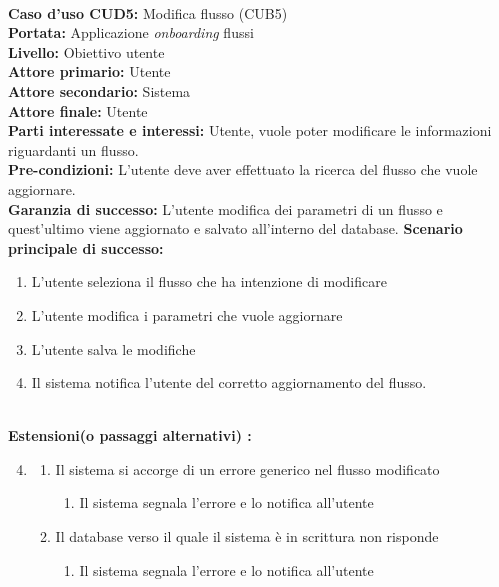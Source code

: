 

\ \\
\textbf{Caso d’uso CUD5:} Modifica flusso (CUB5) \\
\textbf{Portata:} Applicazione \textit{onboarding} flussi\\
\textbf{Livello:} Obiettivo utente \\
\textbf{Attore primario:} Utente \\
\textbf{Attore secondario:} Sistema \\
\textbf{Attore finale:} Utente \\
\textbf{Parti interessate e interessi:} 
Utente, vuole poter modificare le informazioni riguardanti un flusso. \\
\textbf{Pre-condizioni:} L’utente deve aver effettuato la ricerca del flusso che vuole aggiornare.\\
\textbf{Garanzia di successo:} L'utente modifica dei parametri di un flusso e quest'ultimo viene aggiornato e salvato all'interno del database.
\clearpage
\textbf{Scenario principale di successo:} 
\begin{enumerate}
  \item L'utente seleziona il flusso che ha intenzione di modificare
  \item L'utente modifica i parametri che vuole aggiornare
  \item L'utente salva le modifiche
  \item Il sistema notifica l'utente del corretto aggiornamento del flusso.
\end{enumerate} 
\  \\
\textbf{Estensioni(o passaggi alternativi) :}
\begin{enumerate}
\setcounter{enumi}{3}
 \item
     \begin{enumerate}
     \item Il sistema si accorge di un errore generico nel flusso modificato
     \begin{enumerate}
            \item Il sistema segnala l’errore e lo notifica all’utente
        \end{enumerate}
     \item Il database verso il quale il sistema è in scrittura non risponde
        \begin{enumerate}
            \item Il sistema segnala l’errore e lo notifica all’utente
        \end{enumerate}
    \end{enumerate}
 \end{enumerate} 


